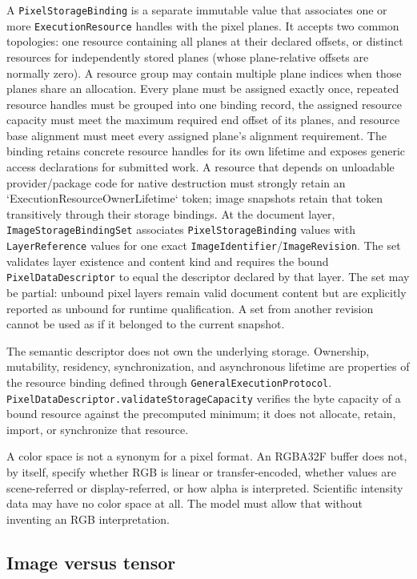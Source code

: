 \documentclass[11pt,a4paper,oneside]{article}
\begin{document}
A \texttt{PixelStorageBinding} is a separate immutable value that associates one or more \texttt{ExecutionResource} handles with the pixel planes. It accepts two common topologies: one resource containing all planes at their declared offsets, or distinct resources for independently stored planes (whose plane-relative offsets are normally zero). A resource group may contain multiple plane indices when those planes share an allocation. Every plane must be assigned exactly once, repeated resource handles must be grouped into one binding record, the assigned resource capacity must meet the maximum required end offset of its planes, and resource base alignment must meet every assigned plane's alignment requirement. The binding retains concrete resource handles for its own lifetime and exposes generic access declarations for submitted work. A resource that depends on unloadable provider/package code for native destruction must strongly retain an `ExecutionResourceOwnerLifetime` token; image snapshots retain that token transitively through their storage bindings. At the document layer, \texttt{ImageStorageBindingSet} associates \texttt{PixelStorageBinding} values with \texttt{LayerReference} values for one exact \texttt{ImageIdentifier}/\texttt{ImageRevision}. The set validates layer existence and content kind and requires the bound \texttt{PixelDataDescriptor} to equal the descriptor declared by that layer. The set may be partial: unbound pixel layers remain valid document content but are explicitly reported as unbound for runtime qualification. A set from another revision cannot be used as if it belonged to the current snapshot.

The semantic descriptor does not own the underlying storage. Ownership, mutability, residency, synchronization, and asynchronous lifetime are properties of the resource binding defined through \texttt{GeneralExecution\allowbreak Protocol}. \texttt{PixelDataDescriptor.validateStorageCapacity} verifies the byte capacity of a bound resource against the precomputed minimum; it does not allocate, retain, import, or synchronize that resource.

A color space is not a synonym for a pixel format. An RGBA32F buffer does not, by itself, specify whether RGB is linear or transfer-encoded, whether values are scene-referred or display-referred, or how alpha is interpreted. Scientific intensity data may have no color space at all. The model must allow that without inventing an RGB interpretation.

\subsection{Image versus tensor}
\end{document}
